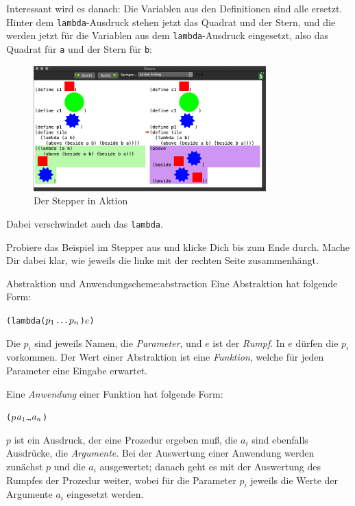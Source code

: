 %
\noindent Interessant wird es danach: Die Variablen aus den Definitionen sind
alle ersetzt.  Hinter dem \texttt{lambda}-Ausdruck stehen jetzt das
Quadrat und der Stern, und die werden jetzt für die Variablen aus dem
\texttt{lambda}-Ausdruck eingesetzt, also das Quadrat für \texttt{a}
und der Stern für \texttt{b}:
%
\begin{figure}[H]
  \centering
  \includegraphics[width=0.8\textwidth]{i1prog/stepper-3}
  \caption{Der Stepper in Aktion}
  \label{fig:stepper-3}
\end{figure}
%
\noindent Dabei verschwindet auch das \texttt{lambda}.
%
\begin{aufgabe}
  Probiere das Beispiel im Stepper aus und klicke Dich bis zum Ende
  durch. Mache Dir dabei klar, wie jeweils die linke mit der rechten
  Seite zusammenhängt.
\end{aufgabe}
%

\begin{feature}{Abstraktion und Anwendung}{scheme:abstraction}
  Eine Abstraktion hat folgende Form:
\begin{alltt}
(lambda (\(p\sb{1} \ldots p\sb{n}\)) \(e\))
\end{alltt}
  Die $p_i$ sind jeweils Namen, die \textit{Parameter}, und
  $e$ ist der \textit{Rumpf}.  In $e$ dürfen die $p_i$
  vorkommen.  Der Wert einer Abstraktion ist eine \textit{Funktion},
  welche für jeden Parameter eine Eingabe erwartet.

  Eine \textit{Anwendung} einer Funktion hat folgende Form:
\begin{alltt}
(\(p\) \(a\sb{1}\) \ldots \(a\sb{n}\))
\end{alltt}
  $p$ ist ein Ausdruck, der eine Prozedur ergeben muß, die $a_i$ sind
  ebenfalls Ausdrücke, die \textit{Argumente}.  Bei
  der Auswertung einer Anwendung werden zunächst $p$ und die $a_i$
  ausgewertet; danach geht es mit der Auswertung des Rumpfes der
  Prozedur weiter, wobei für die Parameter $p_i$ jeweils die Werte der
  Argumente $a_i$ eingesetzt werden.
\end{feature}


